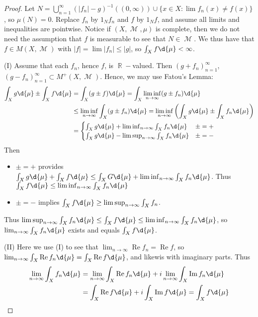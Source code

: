 \documentclass[11pt, a4paper]{memoir}
\DeclareMathOperator{\R}{{\mathbb{R}}}
\theoremstyle{change}
\theoremstyle{plain}
\theoremstyle{nonumberplain}
\newtheorem{proof}{Proof}
\DeclareMathOperator{\M}{{\mathcal{M}}}
\renewcommand{\Re}{\ensuremath{\operatorname{Re}}}
\renewcommand{\Im}{\ensuremath{\operatorname{Im}}}
\begin{document}
\begin{proof}
    Let $N=\bigcup_{n=1}^\infty(|f_n|-g)^{-1}((0,\infty))\cup\{x\in X:\lim f_n(x)\neq f(x)\}$, so $\mu(N)=0$.
    Replace $f_n$ by $1_Nf_n$ and $f$ by $1_Nf$, and assume all limits and inequalities are pointwise.
    Notice if $(X,\M,\mu)$ is complete, then we do not need the assumption that $f$ is measurable to see that $N\in\M$.
    We thus have that $f\in M(X,\M)$ with $|f|=\lim|f_n|\leq |g|$, so $\int_X f\d{\mu}<\infty$.

    (I) Assume that each $f_n$, hence $f$, is $\R-$valued.
    Then $(g+f_n)_{n=1}^\infty$, $(g-f_n)_{n=1}^\infty\subset M^+(X,\M)$.
    Hence, we may use Fatou's Lemma:
    \begin{align*}
        \int_X g\d{\mu}\pm\int_X f\d{\mu} &= \int_X(g\pm f)\d{\mu}=\int_X\liminf_{n\to\infty}(g\pm f_n)\d{\mu}\\
                                          &\leq\liminf_{n\to\infty}\int_X(g\pm f_n)\d{\mu}=\liminf_{n\to\infty}\left(\int_X g\d{\mu}\pm\int_X f_n\d{\mu}\right)\\
                                          &=
        \begin{cases}
            \int_X g\d{\mu}+\liminf_{n\to\infty}\int_X f_n\d{\mu} &\pm=+\\
            \int_X g\d{\mu}-\limsup_{n\to\infty}\int_X f_n\d{\mu} &\pm=-
        \end{cases}
    \end{align*}
    Then
    \begin{itemize}[nolistsep]
        \item $\pm=+$ provides $\int_Xg\d{\mu}+\int_X f\d{\mu}\leq\int_XG\d{\mu}+\liminf_{n\to\infty}\int_Xf_n\d{\mu}$.
            Thus $\int_Xf\d{\mu}\leq\liminf_{n\to\infty}\int_X f_n\d{\mu}$
        \item $\pm=-$ implies $\int_X f\d{\mu}\geq\limsup_{n\to\infty}\int_X f_n$.
    \end{itemize}
    Thus $\limsup_{n\to\infty}\int_Xf_n\d{\mu}\leq\int_Xf\d{\mu}\leq\liminf_{n\to\infty}\int_Xf_n\d{\mu}$, so $\lim_{n\to\infty}\int_Xf_n\d{\mu}$ exists and equals $\int_Xf\d{\mu}$.

    (II) Here we use (I) to see that $\lim_{n\to\infty}\Re f_n=\Re f$, so $\lim_{n\to\infty}\int_X\Re f_n\d{\mu}=\int_X\Re f\d{\mu}$, and likewis with imaginary parts.
    Thus
    \begin{align*}
        \lim_{n\to\infty}\int_Xf_n\d{\mu} &= \lim_{n\to\infty}\int_X\Re f_n\d{\mu}+i\lim_{n\to\infty}\int_X\Im f_n\d{\mu}\\
                                         &= \int_X\Re f\d{\mu}+i\int_X\Im f\d{\mu}=\int_X f\d{\mu}
    \end{align*}
\end{proof}
\end{document}
